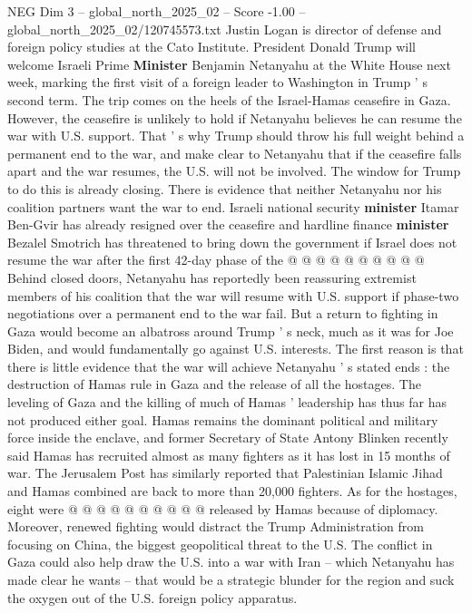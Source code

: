 \begin{textsample}{NEG Dim 3 – global\_north\_2025\_02 – Score -1.00 – global\_north\_2025\_02/120745573.txt}  \label{ex:f3_neg_167}
Justin Logan is director of defense and foreign policy studies at the Cato Institute.
President Donald Trump will welcome Israeli Prime \textbf{Minister} Benjamin Netanyahu at the White House next week, marking the first visit of a foreign leader to Washington in Trump ' s second term.
The trip comes on the heels of the Israel-Hamas ceasefire in Gaza.
However, the ceasefire is unlikely to hold if Netanyahu believes he can resume the war with U.S. support.
That ' s why Trump should throw his full weight behind a permanent end to the war, and make clear to Netanyahu that if the ceasefire falls apart and the war resumes, the U.S. will not be involved.
The window for Trump to do this is already closing.
There is evidence that neither Netanyahu nor his coalition partners want the war to end.
Israeli national security \textbf{minister} Itamar Ben-Gvir has already resigned over the ceasefire and hardline finance \textbf{minister} Bezalel Smotrich has threatened to bring down the government if Israel does not resume the war after the first 42-day phase of the @ @ @ @ @ @ @ @ @ @ Behind closed doors, Netanyahu has reportedly been reassuring extremist members of his coalition that the war will resume with U.S. support if phase-two negotiations over a permanent end to the war fail.
But a return to fighting in Gaza would become an albatross around Trump ' s neck, much as it was for Joe Biden, and would fundamentally go against U.S. interests.
The first reason is that there is little evidence that the war will achieve Netanyahu ' s stated ends : the destruction of Hamas rule in Gaza and the release of all the hostages.
The leveling of Gaza and the killing of much of Hamas ' leadership has thus far has not produced either goal.
Hamas remains the dominant political and military force inside the enclave, and former Secretary of State Antony Blinken recently said Hamas has recruited almost as many fighters as it has lost in 15 months of war.
The Jerusalem Post has similarly reported that Palestinian Islamic Jihad and Hamas combined are back to more than 20,000 fighters.
As for the hostages, eight were @ @ @ @ @ @ @ @ @ @ released by Hamas because of diplomacy.
Moreover, renewed fighting would distract the Trump Administration from focusing on China, the biggest geopolitical threat to the U.S.
The conflict in Gaza could also help draw the U.S. into a war with Iran -- which Netanyahu has made clear he wants -- that would be a strategic blunder for the region and suck the oxygen out of the U.S. foreign policy apparatus.

\end{textsample}
